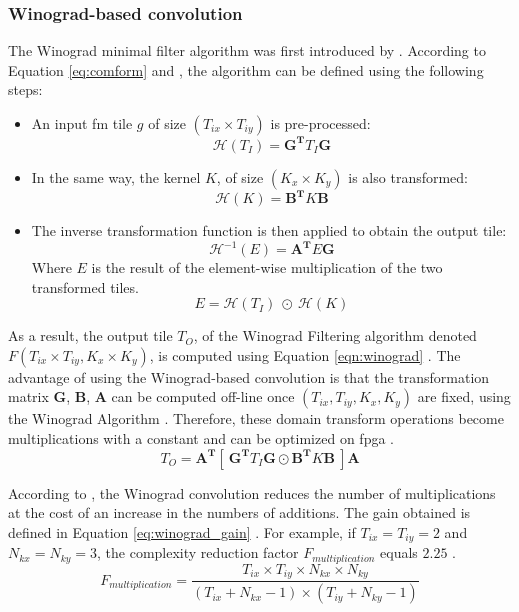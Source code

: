 \subsubsection{Winograd-based convolution}
%
The Winograd minimal filter algorithm was first introduced by \cite{winograd_arithmetic_1980}. According to Equation \eqref{eq:comform} and \textcite{abdelouahab_accelerating_2018}, the algorithm can be defined using the following steps:
\begin{itemize}
    \item An input \acrshort{fm} tile $g$ of size $(T_{ix} \times T_{iy})$ is pre-processed: $$\mathcal{H}(T_I) = \boldsymbol{G^{T}} T_I \boldsymbol{G} $$
    \item In the same way, the kernel $K$, of size $(K_x \times K_y)$ is also transformed: $$\mathcal{H}(K) = \boldsymbol{B^{T}} K \boldsymbol{B}$$
    \item The inverse transformation function is then applied to obtain the output tile: $$\mathcal{H}^{-1}(E) = \boldsymbol{A^{T}} E \boldsymbol{G}$$ Where $E$ is the result of the element-wise multiplication of the two transformed tiles. $$ E = \mathcal{H}(T_I) \ \odot \ \mathcal{H}(K) $$
\end{itemize}
As a result, the output tile $T_O$, of the Winograd Filtering algorithm denoted $F(T_{ix} \times T_{iy}, K_x \times K_y)$, is computed using Equation \eqref{eqn:winograd} \cite{winograd_arithmetic_1980}. The advantage of using the Winograd-based convolution is that the transformation matrix $\boldsymbol{G}$, $\boldsymbol{B}$, $\boldsymbol{A}$ can be computed off-line once $(T_{ix}, T_{iy}, K_x, K_y)$ are fixed, using the Winograd Algorithm \cite{winograd_arithmetic_1980}. Therefore, these domain transform operations become multiplications with a constant and can be optimized on \acrshort{fpga} \cite{liang_evaluating_2020}.
%
\begin{equation}
    T_O = \boldsymbol{A^{T}} [ \ \boldsymbol{G^{T}} T_I \boldsymbol{G} \odot \boldsymbol{B^{T}} K\boldsymbol{B} \ ] \boldsymbol{A}
    \label{eqn:winograd}
\end{equation}

According to \textcite{winograd_arithmetic_1980}, the Winograd convolution reduces the number of multiplications at the cost of an increase in the numbers of additions. The gain obtained is defined in Equation \eqref{eq:winograd_gain} \cite{winograd_arithmetic_1980}. For example, if $T_{ix} = T_{iy} = 2$ and $N_{kx} = N_{ky} = 3$, the complexity reduction factor $F_{multiplication}$ equals $2.25$ \cite{lavin_fast_2016}.
%
\begin{equation}
    F_{multiplication} = \frac{T_{ix} \times T_{iy} \times N_{kx} \times N_{ky}}{(T_{ix} + N_{kx} - 1) \times (T_{iy} + N_{ky} - 1)}
    \label{eq:winograd_gain}
\end{equation}
%
